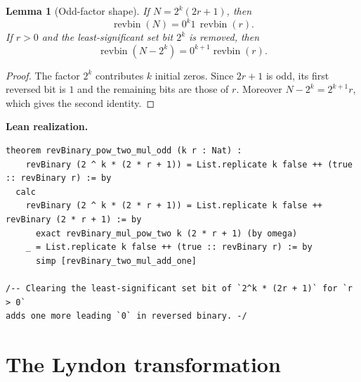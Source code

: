 \documentclass[11pt]{article}
\newtheorem{lemma}[theorem]{Lemma}
\theoremstyle{definition}
\theoremstyle{remark}
\newenvironment{leanbridge}{%
  \par\smallskip\noindent\textbf{Lean realization.}\par\smallskip%
}{%
  \par\smallskip%
}
\newcommand{\revbin}{\operatorname{revbin}}
\begin{document}
\begin{lemma}[Odd-factor shape]\label{lem:shape}
If $N=2^k(2r+1)$, then
\[
 \revbin(N)=0^k1\,\revbin(r).
\]
If $r>0$ and the least-significant set bit $2^k$ is removed, then
\[
 \revbin(N-2^k)=0^{k+1}\revbin(r).
\]
\end{lemma}
\begin{proof}
The factor $2^k$ contributes $k$ initial zeros.  Since $2r+1$ is odd, its
first reversed bit is $1$ and the remaining bits are those of $r$.
Moreover $N-2^k=2^{k+1}r$, which gives the second identity.
\end{proof}
\begin{leanbridge}
\begin{lstlisting}
theorem revBinary_pow_two_mul_odd (k r : Nat) :
    revBinary (2 ^ k * (2 * r + 1)) = List.replicate k false ++ (true :: revBinary r) := by
  calc
    revBinary (2 ^ k * (2 * r + 1)) = List.replicate k false ++ revBinary (2 * r + 1) := by
      exact revBinary_mul_pow_two k (2 * r + 1) (by omega)
    _ = List.replicate k false ++ (true :: revBinary r) := by
      simp [revBinary_two_mul_add_one]

/-- Clearing the least-significant set bit of `2^k * (2r + 1)` for `r > 0`
adds one more leading `0` in reversed binary. -/
\end{lstlisting}
\end{leanbridge}

\section{The Lyndon transformation}
\end{document}
